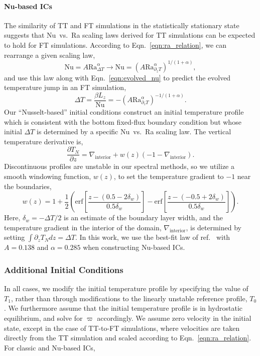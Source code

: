 \documentclass[aps, pre, onecolumn, nofootinbib, notitlepage, groupedaddress, amsfonts, amssymb, amsmath, longbibliography, superscriptaddress]{revtex4-1}
\newcommand{\grad}{\ensuremath{\nabla}}
\newcommand{\ea}[1]{{\color{red} #1}}
\begin{document}
\ea{
\paragraph{Nu-based ICs} 
The similarity of TT and FT simulations in the statistically stationary state suggests that Nu~vs.~Ra scaling laws derived for TT simulations can be expected to hold for FT simulations.
According to Eqn.~\ref{eqn:ra_relation}, we can rearrange a given scaling law,
\begin{equation}
\text{Nu} = A \text{Ra}_{\Delta T}^{\alpha} \rightarrow \text{Nu} = (A \text{Ra}_{\partial_z T}^{\alpha})^{1/(1+\alpha)},
\end{equation}
and use this law along with Eqn.~\ref{eqn:evolved_nu} to predict the evolved temperature jump in an FT simulation,
\begin{equation}
\Delta T = \frac{\beta L_z}{\text{Nu}} = -(A \text{Ra}_{\partial_z T}^{\alpha})^{-1/(1+\alpha)}.
\end{equation}
Our ``Nusselt-based'' initial conditions construct an initial temperature profile which is consistent with the bottom fixed-flux boundary condition but whose initial $\Delta T$ is determined by a specific Nu~vs.~Ra scaling law.
The vertical temperature derivative is,
\begin{equation}
\frac{\partial T_N}{\partial z} = \grad_{\text{interior}} + w(z)(-1 - \grad_{\text{interior}}).
\label{eqn:nu_based_gradT}
\end{equation}
Discontinuous profiles are unstable in our spectral methods, so we utilize a smooth windowing function, $w(z)$, to set the temperature gradient to $-1$ near the boundaries,
$$
w(z) = 1 + \frac{1}{2}\left(\text{erf}\left[\frac{z - (0.5 - 2\delta_w)}{0.5\delta_w}\right] - \text{erf}\left[\frac{z - (-0.5 + 2\delta_w)}{0.5\delta_w}\right]\right).
$$
Here, $\delta_w = -\Delta T / 2$ is an estimate of the boundary layer width, and the temperature gradient in the interior of the domain, $\grad_{\text{interior}}$, is determined by setting $\int \partial_z T_N dz = \Delta T$.
In this work, we use the best-fit law of ref.~\cite{johnston&doering2009} with $A = 0.138$ and $\alpha = 0.285$ when constructing Nu-based ICs.



\subsubsection{Additional Initial Conditions}
In all cases, we modify the initial temperature profile by specifying the value of $T_1$, rather than through modifications to the linearly unstable reference profile, $T_0$.
We furthermore assume that the initial temperature profile is in hydrostatic equilibrium, and solve for $\varpi$ accordingly.
We assume zero velocity in the initial state, except in the case of TT-to-FT simulations, where velocities are taken directly from the TT simulation and scaled according to Eqn.~\ref{eqn:ra_relation}.
For classic and Nu-based ICs,
}
\end{document}
